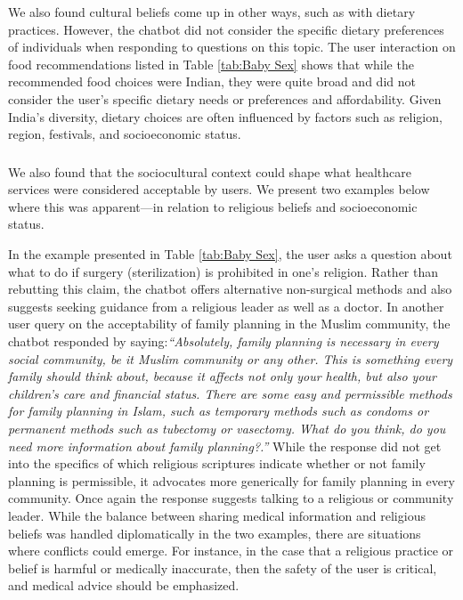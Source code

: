 We also found cultural beliefs come up in other ways, such as with dietary practices. However, the chatbot did not consider the specific dietary preferences of individuals when responding to questions on this topic. The user interaction on food recommendations listed in Table \ref{tab:Baby Sex} shows that while the recommended food choices were Indian, they were quite broad and did not consider the user's specific dietary needs or preferences and affordability. Given India's diversity, dietary choices are often influenced by factors such as religion, region, festivals, and socioeconomic status. 

\subsubsection{ }
We also found that the sociocultural context could shape what healthcare services were considered acceptable by users. We present two examples below where this was apparent---in relation to religious beliefs and socioeconomic status. 

In the example presented in Table \ref{tab:Baby Sex}, the user asks a question about what to do if surgery (sterilization) is prohibited in one's religion. Rather than rebutting this claim, the chatbot offers alternative non-surgical methods and also suggests seeking guidance from a religious leader as well as a doctor.
In another user query on the acceptability of family planning in the Muslim community, the chatbot responded by saying:{\textit{``Absolutely, family planning is necessary in every social community, be it Muslim community or any
other. This is something every family should think about, because it affects not only your health,
but also your children’s care and financial status. There are some easy and permissible methods for
family planning in Islam, such as temporary methods such as condoms or permanent methods such as
tubectomy or vasectomy. What do you think, do you need more information about family planning?.''}}
While the response did not get into the specifics of which religious scriptures indicate whether or not family planning is permissible, it advocates more generically for family planning in every community. 
Once again the response suggests talking to a religious or community leader.
While the balance between sharing medical information and religious beliefs was handled diplomatically in the two examples, there are situations where conflicts could emerge.
For instance, in the case that a religious practice or belief is harmful or medically inaccurate, then the safety of the user is critical, and medical advice should be emphasized.

